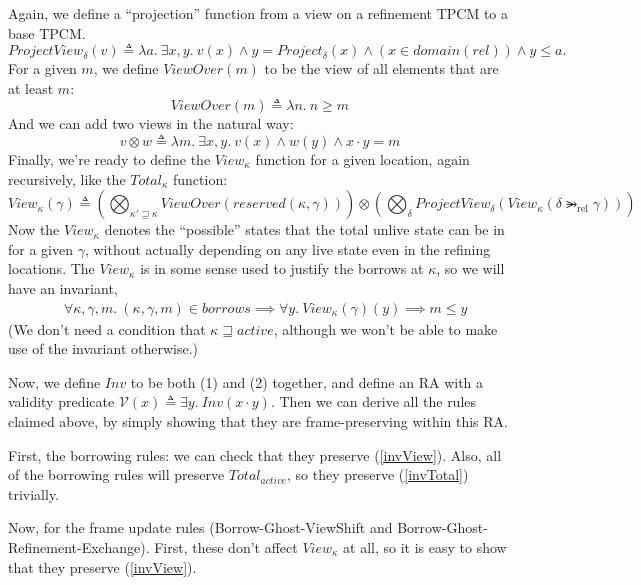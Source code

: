 \documentclass{article}
\DeclareMathOperator{\rel}{rel}
\renewcommand{\eqdef}{\triangleq}
\newcommand{\refines}{\rightarrowgtr}
\newcommand{\ltGe}{\sqsupseteq}
\newcommand\Bigcircle{\raisebox{-0.5mm}{\scalebox{1.7}{$\bigcirc$}}}
\begin{document}
Again, we define a ``projection'' function from a view on a refinement TPCM to a base TPCM.
\[
  ProjectView_\delta(v) \eqdef \lambda a .~
      \exists x, y .~ v(x) \land y = Project_\delta(x) \land (x \in domain(rel)) \land y \le a.
\]
For a given $m$, we define $ViewOver(m)$ to be the view of all elements that are at least $m$:
\[
  ViewOver(m) \eqdef \lambda n .~ n \ge m
\]
And we can add two views in the natural way:
\[
  v \otimes w \eqdef \lambda m .~ \exists x, y .~ v(x) \land w(y) \land x \cdot y = m
\]
Finally, we're ready to define the $View_\kappa$ function for a given location, again
recursively, like the $Total_\kappa$ function:
\[
  View_\kappa(\gamma) \eqdef 
      \left(
        \bigotimes_{\kappa' \ltGe \kappa} ViewOver(reserved(\kappa,\gamma))
      \right) \otimes
      \left(
        \bigotimes_{\delta} ProjectView_\delta\left(View_\kappa(\delta \refines_{\rel} \gamma)\right)
      \right)
\]
Now the $View_\kappa$ denotes the ``possible'' states that the total unlive state can be in
for a given $\gamma$, without actually depending on any live state even in the refining locations. The $View_\kappa$ is in some sense used to justify the borrows at $\kappa$, so we will have an invariant,
\begin{align}
  & \forall \kappa, \gamma, m .~
  (\kappa, \gamma, m) \in borrows \implies \forall y .~ View_\kappa(\gamma)(y) \implies m \le y
  \label{invView}
\end{align}
(We don't need a condition that $\kappa \ltGe active$, although we won't be able to make use
of the invariant otherwise.)

Now, we define $Inv$ to be both (1) and (2) together, and define an RA with a validity predicate $\mathcal{V}(x) \eqdef \exists y.~ Inv(x \cdot y)$. Then we can derive all the rules
claimed above, by simply showing that they are frame-preserving within this RA.

First, the borrowing rules: we can check that they preserve (\ref{invView}).
Also, all of the borrowing rules will preserve $Total_{active}$,
so they preserve (\ref{invTotal}) trivially.

Now, for the frame update rules (Borrow-Ghost-ViewShift and Borrow-Ghost-Refinement-Exchange).
First, these don't affect $View_{\kappa}$ at all, so it is easy to show that they preserve
(\ref{invView}).
\end{document}
